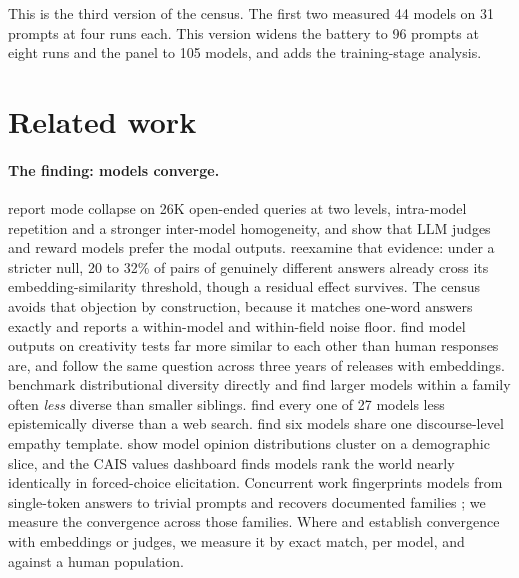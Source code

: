 \documentclass[11pt]{article}
\begin{document}
This is the third version of the census. The first two measured 44 models on 31 prompts at four runs each. This version widens the battery to 96 prompts at eight runs and the panel to 105 models, and adds the training-stage analysis.

\section{Related work}
\label{sec:related}

\paragraph{The finding: models converge.}
\citet{jiang2025hivemind} report mode collapse on 26K open-ended queries at two levels, intra-model repetition and a stronger inter-model homogeneity, and show that LLM judges and reward models prefer the modal outputs. \citet{schaeffer2026hivemind} reexamine that evidence: under a stricter null, 20 to 32\% of pairs of genuinely different answers already cross its embedding-similarity threshold, though a residual effect survives. The census avoids that objection by construction, because it matches one-word answers exactly and reports a within-model and within-field noise floor. \citet{wenger2025different} find model outputs on creativity tests far more similar to each other than human responses are, and \citet{patel2026similarly} follow the same question across three years of releases with embeddings. \citet{zhang2025noveltybench} benchmark distributional diversity directly and find larger models within a family often \emph{less} diverse than smaller siblings. \citet{wright2025epistemic} find every one of 27 models less epistemically diverse than a web search. \citet{gueorguieva2026templatic} find six models share one discourse-level empathy template. \citet{santurkar2023whose} show model opinion distributions cluster on a demographic slice, and the CAIS values dashboard \citep{cais2025values} finds models rank the world nearly identically in forced-choice elicitation. Concurrent work fingerprints models from single-token answers to trivial prompts and recovers documented families \citep{bruckner2026onetoken}; we measure the convergence across those families. Where \citet{jiang2025hivemind} and \citet{zhang2025noveltybench} establish convergence with embeddings or judges, we measure it by exact match, per model, and against a human population.
\end{document}
